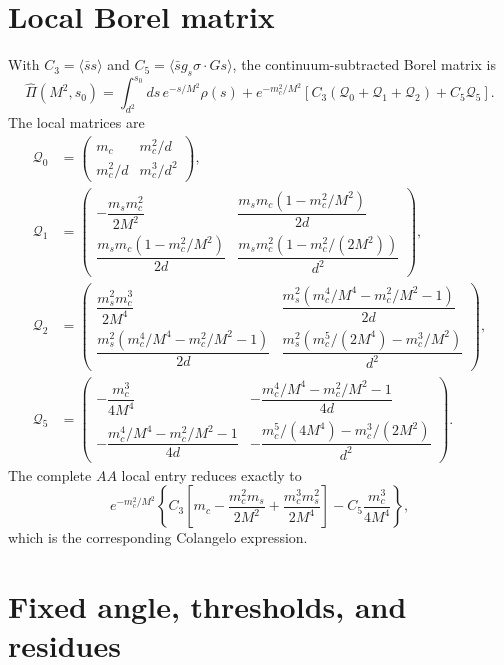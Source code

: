 \documentclass[11pt]{article}
\begin{document}
\section{Local Borel matrix}

With $C_3=\langle\bar ss\rangle$ and
$C_5=\langle\bar s g_s\sigma\!\cdot\!G s\rangle$, the continuum-subtracted
Borel matrix is
\begin{equation}
\widehat\Pi(M^2,s_0)=
\int_{d^2}^{s_0}ds\,e^{-s/M^2}\rho(s)
+e^{-m_c^2/M^2}\left[C_3(\mathcal Q_0+\mathcal Q_1+\mathcal Q_2)
+C_5\mathcal Q_5\right].
\end{equation}
The local matrices are
\begin{align}
\mathcal Q_0&=
\begin{pmatrix}m_c&m_c^2/d\\m_c^2/d&m_c^3/d^2\end{pmatrix},\\
\mathcal Q_1&=
\begin{pmatrix}
-\dfrac{m_sm_c^2}{2M^2}&
\dfrac{m_sm_c(1-m_c^2/M^2)}{2d}\\
\dfrac{m_sm_c(1-m_c^2/M^2)}{2d}&
\dfrac{m_sm_c^2(1-m_c^2/(2M^2))}{d^2}
\end{pmatrix},\\
\mathcal Q_2&=
\begin{pmatrix}
\dfrac{m_s^2m_c^3}{2M^4}&
\dfrac{m_s^2(m_c^4/M^4-m_c^2/M^2-1)}{2d}\\
\dfrac{m_s^2(m_c^4/M^4-m_c^2/M^2-1)}{2d}&
\dfrac{m_s^2(m_c^5/(2M^4)-m_c^3/M^2)}{d^2}
\end{pmatrix},\\
\mathcal Q_5&=
\begin{pmatrix}
-\dfrac{m_c^3}{4M^4}&
-\dfrac{m_c^4/M^4-m_c^2/M^2-1}{4d}\\
-\dfrac{m_c^4/M^4-m_c^2/M^2-1}{4d}&
-\dfrac{m_c^5/(4M^4)-m_c^3/(2M^2)}{d^2}
\end{pmatrix}.
\end{align}
The complete $AA$ local entry reduces exactly to
\begin{equation}
e^{-m_c^2/M^2}\left\{
C_3\left[m_c-\frac{m_c^2m_s}{2M^2}
+\frac{m_c^3m_s^2}{2M^4}\right]
-C_5\frac{m_c^3}{4M^4}\right\},
\end{equation}
which is the corresponding Colangelo expression.

\section{Fixed angle, thresholds, and residues}
\end{document}
